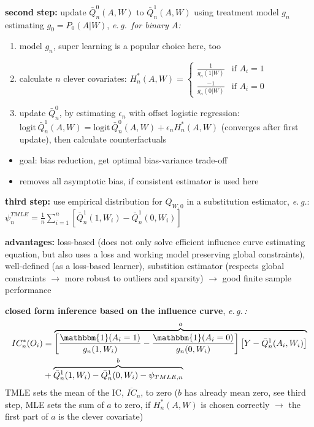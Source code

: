 \documentclass[8pt,twoside]{extarticle}
\begin{document}
\begin{multicols}{2}
 \textbf{second step:} update $\bar{Q}^0_n(A,W)$ to $\bar{Q}^1_n(A,W)$ using treatment model $g_n$ estimating $g_0 = P_0(A|W)$, \textit{e.\,g.\ for binary $A$:} 
\begin{enumerate}[leftmargin=*, itemsep=0em, topsep=0pt, partopsep=0pt,parsep=0pt]
\setlength{\itemsep}{0pt}%
\setlength{\parskip}{0pt}
\item model $g_n$,  super learning is a popular choice here, too
\item calculate $n$ clever covariates: $H^*_n(A,W) {=} \begin{cases}\frac{1}{g_n(1|W)}  &\text{if } A_i{=}1 \\   \frac{{-}1}{g_n(0|W)}        &\text{if } A_i{=}0 \end{cases}$
\item update $\bar{Q}_n^0$, by estimating $\epsilon_n$ with offset logistic regression: $\mathrm{logit} \, \bar{Q}_n^1(A,W) = \mathrm{logit}\, \bar{Q}_n^0(A,W) + \epsilon_n H_n^*(A,W)$ \newline (converges after first update), then calculate counterfactuals
\end{enumerate}
\begin{itemize}[leftmargin=*, itemsep=0em, topsep=0pt, partopsep=0pt,parsep=0pt]
\setlength{\itemsep}{0pt}%
\setlength{\parskip}{0pt}
\item goal: bias reduction, get optimal bias-variance trade-off
\item removes all asymptotic bias, if consistent estimator is used here
\end{itemize}

 \textbf{third step:} use empirical distribution for $Q_{W,0}$ in a substitution estimator, \textit{e.\,g.}: $\psi_n^{TMLE} = \frac{1}{n}\sum_{i=1}^n \left[\bar{Q}^1_n(1,W_i) -  \bar{Q}^1_n(0,W_i)\right] $ 



 \textbf{advantages:} loss-based (does not only solve efficient influence curve estimating equation, but also uses a loss and working model preserving global constraints), well-defined (as a loss-based learner), substition estimator (respects global constraints $\to$ more robust to outliers and sparsity) $\to$ good finite sample performance



 \textbf{closed form inference based on the influence curve}, \textit{e.\,g.\,:}
\begin{align*}IC_n^*(O_i) &= \overbrace{\left[\frac{\mathbbm{1}(A_i=1)}{g_n(1,W_i)} - \frac{\mathbbm{1}(A_i=0)}{g_n(0,W_i)}\right] \left[Y-\bar{Q}^1_n(A_i,W_i)\right]}^{a} \\ 
&+ \overbrace{\bar{Q}^1_n(1,W_i) - \bar{Q}^1_n(0,W_i) -\psi_{TMLE,n}}^{b} 
\end{align*}
TMLE sets the mean of the IC, $\overline{IC}_n$, to zero ($b$ has already mean zero, see third step, MLE sets the sum of $a$ to zero, if $H_n^*(A,W)$ is chosen correctly $\to$ the first part of $a$ is the clever covariate)


\end{multicols}
\end{document}
